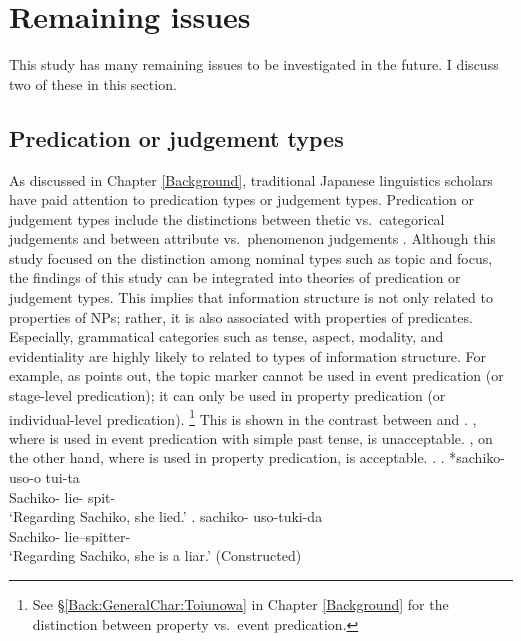 \section{Remaining issues}

This study has many remaining issues to be investigated in the future.
I discuss two of these in this section.


\subsection{Predication or judgement types}

As discussed in Chapter \ref{Background},
traditional Japanese linguistics scholars have paid attention to
predication types or judgement types.
Predication or judgement types include the distinctions between thetic vs.~categorical judgements and between attribute vs.~phenomenon judgements
\cite{matsushita28,yamada36,mio48,kuroda72,masuoka08,kageyama12}.
Although this study focused on the distinction among nominal types such as topic and focus,
the findings of this study can be integrated into theories of predication or judgement types.
This implies that information structure is not only related to properties of NPs;
rather, it is also associated with properties of predicates.
Especially, grammatical categories such as tense, aspect, modality, and evidentiality are highly likely to related to types of information structure.
For example, as  points out,
the topic marker  cannot be used in event predication (or stage-level predication);
it can only be used in property predication (or individual-level predication).%
 \footnote{
 See \S \ref{Back:GeneralChar:Toiunowa} in Chapter \ref{Background}
 for the distinction between property vs.~event predication.
 }
This is shown in the contrast between \Next[a] and \Next[b].
\Next[a], where  is used in event predication with simple past tense,
is unacceptable.
\Next[b],
on the other hand, where  is used in property predication,
is acceptable.
%
\ex.
 \ag. *sachiko- uso-o tui-ta \\
      Sachiko- lie- spit- \\
      `Regarding Sachiko, she lied.'
     \hfill{\cite[p.~96]{masuoka12}}
 \bg. sachiko- uso-tuki-da \\
      Sachiko- lie--spitter- \\
      `Regarding Sachiko, she is a liar.'
     \hfill{(Constructed)}

